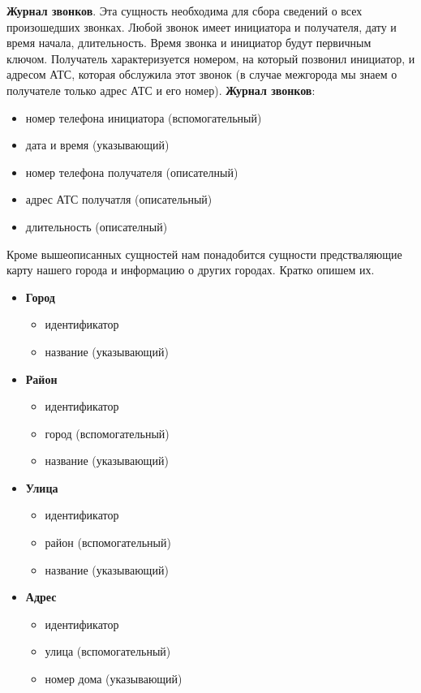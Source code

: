 \documentclass{report}
\begin{document}
\textbf{Журнал звонков}. Эта сущность необходима для сбора сведений 
о всех произошедших звонках. Любой звонок имеет инициатора и получателя, 
дату и время начала, длительность. Время звонка и инициатор 
будут первичным ключом. Получатель характеризуется номером, на 
который позвонил инициатор, и адресом АТС, которая обслужила этот звонок
(в случае межгорода мы знаем о получателе только адрес АТС и его номер).
\newline\textbf{Журнал звонков}:
\begin{itemize}
    \item номер телефона инициатора (вспомогательный)
    \item дата и время (указывающий)
    \item номер телефона получателя (описателный)
    \item адрес АТС получатля (описательный)
    \item длительность (описателный)
\end{itemize}

Кроме вышеописанных сущностей нам понадобится сущности предстваляющие карту 
нашего города и информацию о других городах. Кратко опишем их.
\begin{itemize}
    \item[] \textbf{Город}
    \begin{itemize}
        \item идентификатор
        \item название (указывающий)
    \end{itemize}
    \item[] \textbf{Район}
    \begin{itemize}
        \item идентификатор
        \item город (вспомогательный)
        \item название (указывающий)
    \end{itemize} 
    \item[] \textbf{Улица}
    \begin{itemize}
        \item идентификатор
        \item район (вспомогательный)
        \item название (указывающий)
    \end{itemize} 
    \item[] \textbf{Адрес}
    \begin{itemize}
        \item идентификатор
        \item улица (вспомогательный)
        \item номер дома (указывающий)
    \end{itemize} 
\end{itemize}
\end{document}
